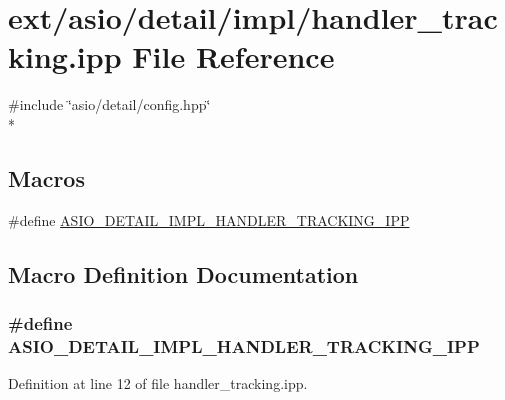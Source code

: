 \hypertarget{handler__tracking_8ipp}{}\section{ext/asio/detail/impl/handler\+\_\+tracking.ipp File Reference}
\label{handler__tracking_8ipp}
{\ttfamily \#include \char`\"{}asio/detail/config.\+hpp\char`\"{}}\\*
\subsection*{Macros}
\begin{DoxyCompactItemize}
\item 
\#define \hyperlink{handler__tracking_8ipp_ad15283d3a5367f4b0825162af2d23ab2}{A\+S\+I\+O\+\_\+\+D\+E\+T\+A\+I\+L\+\_\+\+I\+M\+P\+L\+\_\+\+H\+A\+N\+D\+L\+E\+R\+\_\+\+T\+R\+A\+C\+K\+I\+N\+G\+\_\+\+I\+P\+P}
\end{DoxyCompactItemize}


\subsection{Macro Definition Documentation}
\hypertarget{handler__tracking_8ipp_ad15283d3a5367f4b0825162af2d23ab2}{}
\subsubsection[{A\+S\+I\+O\+\_\+\+D\+E\+T\+A\+I\+L\+\_\+\+I\+M\+P\+L\+\_\+\+H\+A\+N\+D\+L\+E\+R\+\_\+\+T\+R\+A\+C\+K\+I\+N\+G\+\_\+\+I\+P\+P}]{\setlength{\rightskip}{0pt plus 5cm}\#define A\+S\+I\+O\+\_\+\+D\+E\+T\+A\+I\+L\+\_\+\+I\+M\+P\+L\+\_\+\+H\+A\+N\+D\+L\+E\+R\+\_\+\+T\+R\+A\+C\+K\+I\+N\+G\+\_\+\+I\+P\+P}\label{handler__tracking_8ipp_ad15283d3a5367f4b0825162af2d23ab2}


Definition at line 12 of file handler\+\_\+tracking.\+ipp.

